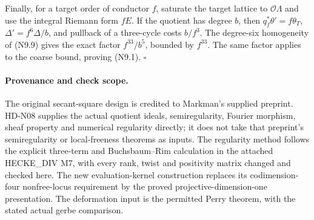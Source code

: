 Finally, for a target order of conductor $f$, saturate the
target lattice to $\mathcal O\Lambda$ and use the integral
Riemann form $fE$. If the quotient has degree $b$, then
$q_f^*\theta'=f\theta_T$,
$\Delta'=f^6\Delta/b$, and pullback of a three-cycle costs
$b/f^3$. The degree-six homogeneity of (N9.9) gives the exact
factor $f^{33}/b^5$, bounded by $f^{33}$. The same factor applies
to the coarse bound, proving (N9.1). \hfill$\square$

\paragraph{Provenance and check scope.}
The original secant-square design is credited to Markman's supplied
preprint. HD-N08 supplies the actual quotient ideals, semiregularity,
Fourier morphism, sheaf property and numerical regularity directly;
it does not take that preprint's semiregularity or local-freeness
theorems as inputs. The regularity method follows the explicit
three-term and Buchsbaum--Rim calculation in the attached
HECKE\_DIV M7, with every rank, twist and positivity matrix changed
and checked here. The new evaluation-kernel construction replaces
its codimension-four nonfree-locus requirement by the proved
projective-dimension-one presentation. The deformation input is
the permitted Perry theorem, with the stated actual gerbe comparison.
